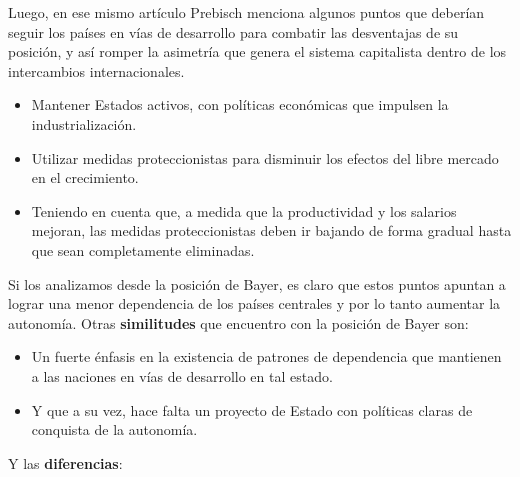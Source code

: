 Luego, en ese mismo artículo Prebisch menciona algunos puntos que deberían seguir los países en vías de desarrollo para combatir las desventajas de su posición, y así romper la asimetría que genera el sistema capitalista dentro de los intercambios internacionales.

 \begin{itemize}
     \item Mantener Estados activos, con políticas económicas que impulsen la industrialización.
     \item Utilizar medidas proteccionistas para disminuir los efectos del libre mercado en el crecimiento.
     \item Teniendo en cuenta que, a medida que la productividad y los salarios mejoran, las medidas proteccionistas deben ir bajando de forma gradual hasta que sean completamente eliminadas.
 \end{itemize}

 Si los analizamos desde la posición de Bayer, es claro que estos puntos apuntan a lograr una menor dependencia de los países centrales y por lo tanto aumentar la autonomía. Otras \textbf{similitudes} que encuentro con la posición de Bayer son:

 \begin{itemize}
     \item Un fuerte énfasis en la existencia de patrones de dependencia que mantienen a las naciones en vías de desarrollo en tal estado.
     \item Y que a su vez, hace falta un proyecto de Estado con políticas claras de conquista de la autonomía.
 \end{itemize}

 Y las \textbf{diferencias}:

